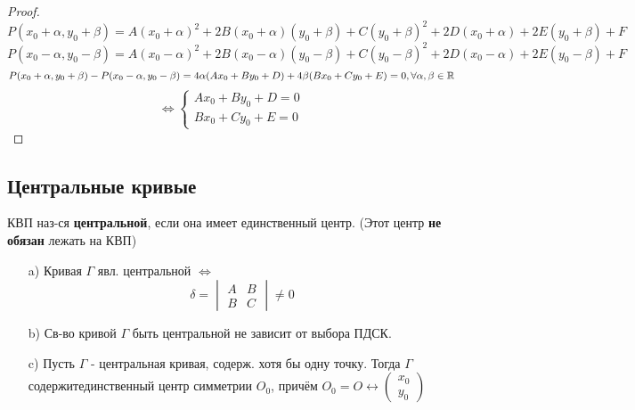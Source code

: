 \begin{proof}
\[
P(x_0 + \alpha, y_0 + \beta) = A(x_0 + \alpha)^{2} + 2B(x_0 + \alpha)(y_0 + \beta) + C(y_0 + \beta)^{2} + 2D(x_0 + \alpha) + 2E(y_0 + \beta) + F
\]
\[
P(x_0 - \alpha, y_0 - \beta) = A(x_0 - \alpha)^{2} + 2B(x_0 - \alpha)(y_0 - \beta) + C(y_0 - \beta)^{2} + 2D(x_0 - \alpha) + 2E(y_0 - \beta) + F
\]
\[
P(x_0 + \alpha, y_0 + \beta) - P(x_0 - \alpha, y_0 - \beta) = 4\alpha(Ax_0 + By_0 + D) + 4\beta(Bx_0 + Cy_0 + E) = 0, \forall \alpha, \beta \in \mathbb{R}
\]
\[
\iff \begin{cases}
Ax_0 + By_0 + D = 0 \\
Bx_0 + Cy_0 + E = 0
\end{cases}
\]
\end{proof}
\subsection{Центральные кривые}
\begin{definition}
КВП наз-ся \textbf{центральной}, если она имеет единственный центр. (Этот центр \textbf{не обязан} лежать на КВП)
\end{definition}
\begin{statement}
\begin{itemize}
  \item [a) ] Кривая $\Gamma$ явл. центральной $\iff$
    \[
      \delta = \begin{vmatrix}A & B \\ B & C \end{vmatrix} \neq 0
    \]
  \item [b) ] Св-во кривой $\Gamma$ быть центральной не зависит от выбора ПДСК.
  \item [c) ] Пусть $\Gamma$ - центральная кривая, содерж. хотя бы одну точку. Тогда $\Gamma$ содержитединственный центр симметрии $O_0$, причём $O_0 = O \underset{}{\longleftrightarrow} \begin{pmatrix} x_0 \\ y_0 \end{pmatrix}$
\end{itemize}
\end{statement}
